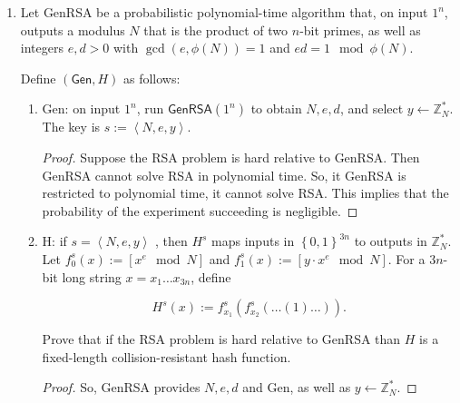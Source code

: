 \documentclass{article}
\begin{document}
\begin{enumerate}
\begin{enumerate}
        \begin{proof}
            Suppose that DDH is hard relative to $\mathcal{G}$. Then Pr[$DDH_{\mathcal{A}, \mathcal{G}}$=1] $\leq$ negl(n). Now consider the CDH problem. If CDH is easy, DDH is also easy. By contraposition, if DDH is hard, CDH is hard. This implies that CDH is hard, so Pr[$CDH_{\mathcal{A}, \mathcal{G}}$=1] $\leq$ negl(n). Because the experiment has a negligible chance of succeeding, the CDH problem is hard relative to $\mathcal{G}$.
        \end{proof}
    \end{enumerate}
  \item Let \textsf{GenRSA} be a probabilistic polynomial-time algorithm that,
    on input $1^n$, outputs a modulus $N$ that is the product of two $n$-bit 
    primes, as well as integers $e, d > 0$ with $\gcd(e, \phi(N)) = 1$ and 
    $ed = 1 \mod \phi(N)$.

    Define $(\textsf{Gen}, H)$ as follows:

    \begin{enumerate}
      \item \textsf{Gen}: on input $1^n$, run $\textsf{GenRSA}(1^n)$ to obtain
        $N, e, d$, and select $y \leftarrow \mathbb{Z}^{*}_N$. The key is $s := \left<N, e,
        y\right>$.

        \begin{proof}
          Suppose the RSA problem is hard relative to \textsf{GenRSA}. Then
          \textsf{GenRSA} cannot solve \textsf{RSA} in polynomial time. So, it
          \textsf{GenRSA} is restricted to polynomial time, it cannot solve
          \textsf{RSA}. This implies that the probability of the experiment
          succeeding is negligible.
        \end{proof}

      \item \textsf{H}: if $s = \left<N, e, y\right>$ , then $H^s$ maps inputs
        in $\left\{0, 1\right\}^{3n}$ to outputs in $\mathbb{Z}^{*}_N$. Let $f_0^s(x) :=
        [x^e \mod N]$ and $f_1^s(x) := [y \cdot x^e \mod N]$. For a $3n$-bit long
        string $x = x_1 \dots x_{3n}$, define

        \[
          H^s(x) := f_{x_1}^s(f_{x_2}^s(\dots(1)\dots)).
        \]

        Prove that if the RSA problem is hard relative to \textsf{GenRSA} than
        $H$ is a fixed-length collision-resistant hash function.

        \begin{proof}
          So, \textsf{GenRSA} provides $N, e, d$ and \textsf{Gen}, as well as $y
          \leftarrow \mathbb{Z}^{*}_{N}$.


\end{proof}
\end{enumerate}
\end{enumerate}
\end{document}
